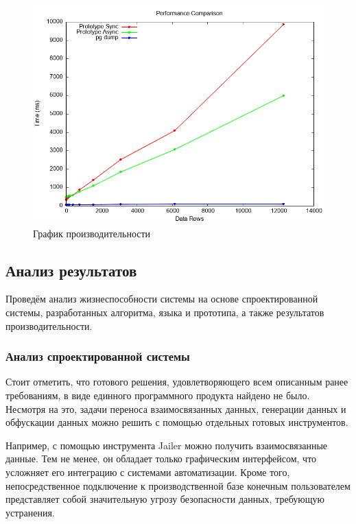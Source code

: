 \begin{figure}
  \includegraphics[scale=0.75]{./img/benchmark.png}
  \caption{График производительности}
  \label{benchmark}
\end{figure}

\subsection{Анализ результатов}

Проведём анализ жизнеспособности системы на основе спроектированной системы, разработанных алгоритма, языка и прототипа, а также результатов производительности.

\subsubsection{Анализ спроектированной системы}

Стоит отметить, что готового решения, удовлетворяющего всем описанным ранее требованиям, в виде единного программного продукта найдено не было. Несмотря на это, задачи переноса взаимосвязанных данных, генерации данных и обфускации данных можно решить с помощью отдельных готовых инструментов.

Например, с помощью инструмента Jailer \cite{jailer} можно получить взаимосвязанные данные. Тем не менее, он обладает только графическим интерфейсом, что усложняет его интеграцию с системами автоматизации. Кроме того, непосредственное подключение к производственной базе конечным пользователем представляет собой значительную угрозу безопасности данных, требующую устранения.

